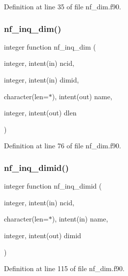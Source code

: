 Definition at line 35 of file nf\+\_\+dim.\+f90.

\mbox{\label{nf__dim_8f90_acc7d09ee1f217ff454bf44e513c96cfa}} 
\subsubsection{\texorpdfstring{nf\+\_\+inq\+\_\+dim()}{nf\_inq\_dim()}}
{\footnotesize\ttfamily integer function nf\+\_\+inq\+\_\+dim (\begin{DoxyParamCaption}\item[{integer, intent(in)}]{ncid,  }\item[{integer, intent(in)}]{dimid,  }\item[{character(len=$\ast$), intent(out)}]{name,  }\item[{integer, intent(out)}]{dlen }\end{DoxyParamCaption})}



Definition at line 76 of file nf\+\_\+dim.\+f90.

\mbox{\label{nf__dim_8f90_a13052e9476061a38bbc565fddce6af46}} 
\subsubsection{\texorpdfstring{nf\+\_\+inq\+\_\+dimid()}{nf\_inq\_dimid()}}
{\footnotesize\ttfamily integer function nf\+\_\+inq\+\_\+dimid (\begin{DoxyParamCaption}\item[{integer, intent(in)}]{ncid,  }\item[{character(len=$\ast$), intent(in)}]{name,  }\item[{integer, intent(out)}]{dimid }\end{DoxyParamCaption})}



Definition at line 115 of file nf\+\_\+dim.\+f90.

\mbox{\label{nf__dim_8f90_a59a9fd1ab9aac41ed35c4f41c18e5568}} 
